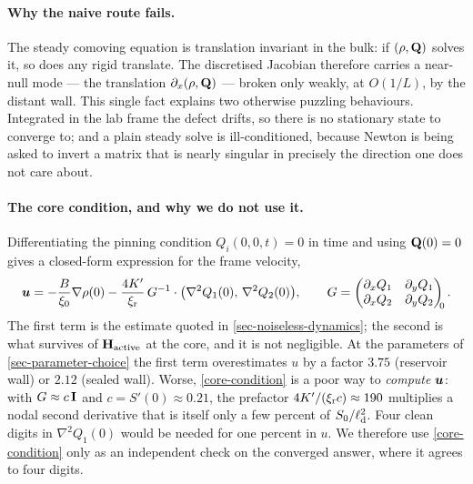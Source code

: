 \documentclass[a5paper]{article}
\begin{document}
\paragraph{Why the naive route fails.} The steady comoving equation is translation invariant in the bulk: if $(\rho, \mathbf{Q})$ solves it, so does any rigid translate. The discretised Jacobian therefore carries a near-null mode --- the translation $\partial_x(\rho, \mathbf{Q})$ --- broken only weakly, at $O(1/L)$, by the distant wall. This single fact explains two otherwise puzzling behaviours. Integrated in the lab frame the defect drifts, so there is no stationary state to converge to; and a plain steady solve is ill-conditioned, because Newton is being asked to invert a matrix that is nearly singular in precisely the direction one does not care about.

\paragraph{The core condition, and why we do not use it.} Differentiating the pinning condition $Q_i(0,0,t) = 0$ in time and using $\mathbf{Q}(0) = 0$ gives a closed-form expression for the frame velocity,
\begin{align}
    \label{core-condition}
    \boldsymbol{u} = -\frac{B}{\xi_0}\nabla\rho(0)
         - \frac{4K'}{\xi_{\rm r}}\, G^{-1} \cdot \big(\nabla^2 Q_1(0),\, \nabla^2 Q_2(0)\big),
    \qquad
    G = \begin{pmatrix} \partial_x Q_1 & \partial_y Q_1 \\ \partial_x Q_2 & \partial_y Q_2\end{pmatrix}_{\!\!0}.
\end{align}
The first term is the estimate quoted in \cref{sec-noiseless-dynamics}; the second is what survives of $\mathbf{H}_\text{active}$ at the core, and it is not negligible. At the parameters of \cref{sec-parameter-choice} the first term overestimates $u$ by a factor $3.75$ (reservoir wall) or $2.12$ (sealed wall). Worse, \eqref{core-condition} is a poor way to \emph{compute} $\boldsymbol{u}$: with $G \approx c\,\boldsymbol{\mathrm{I}}$ and $c = S'(0) \approx 0.21$, the prefactor $4K'/(\xi_{\rm r} c) \approx 190$ multiplies a nodal second derivative that is itself only a few percent of $S_0/\ell_{\rm d}^2$. Four clean digits in $\nabla^2 Q_1(0)$ would be needed for one percent in $u$. We therefore use \eqref{core-condition} only as an independent check on the converged answer, where it agrees to four digits.
\end{document}
